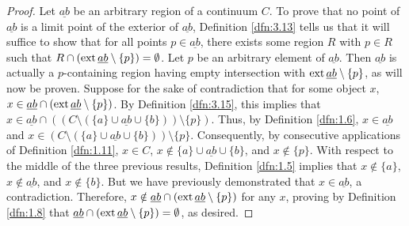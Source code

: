 \documentclass[../main.tex]{subfiles}
\begin{document}
\begin{lemma}
\begin{proof}
        Let $\underline{ab}$ be an arbitrary region of a continuum $C$. To prove that no point of $\underline{ab}$ is a limit point of the exterior of $\underline{ab}$, Definition \ref{dfn:3.13} tells us that it will suffice to show that for all points $p\in\underline{ab}$, there exists some region $R$ with $p\in R$ such that $R\cap(\operatorname{ext}\underline{ab}\setminus\{p\})=\emptyset$. Let $p$ be an arbitrary element of $\underline{ab}$. Then $\underline{ab}$ is actually a $p$-containing region having empty intersection with $\operatorname{ext}\underline{ab}\setminus\{p\}$, as will now be proven. Suppose for the sake of contradiction that for some object $x$, $x\in\underline{ab}\cap(\operatorname{ext}\underline{ab}\setminus\{p\})$. By Definition \ref{dfn:3.15}, this implies that $x\in\underline{ab}\cap((C\setminus(\{a\}\cup\underline{ab}\cup\{b\}))\setminus\{p\})$. Thus, by Definition \ref{dfn:1.6}, $x\in\underline{ab}$ and $x\in(C\setminus(\{a\}\cup\underline{ab}\cup\{b\}))\setminus\{p\}$. Consequently, by consecutive applications of Definition \ref{dfn:1.11}, $x\in C$, $x\notin\{a\}\cup\underline{ab}\cup\{b\}$, and $x\notin\{p\}$. With respect to the middle of the three previous results, Definition \ref{dfn:1.5} implies that $x\notin\{a\}$, $x\notin\underline{ab}$, and $x\notin\{b\}$. But we have previously demonstrated that $x\in\underline{ab}$, a contradiction. Therefore, $x\notin\underline{ab}\cap(\operatorname{ext}\underline{ab}\setminus\{p\})$ for any $x$, proving by Definition \ref{dfn:1.8} that $\underline{ab}\cap(\operatorname{ext}\underline{ab}\setminus\{p\})=\emptyset$, as desired.
    \end{proof}
\end{lemma}
\end{document}
